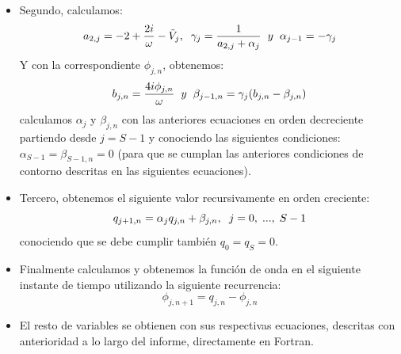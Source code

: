 \documentclass[12pt,paper]{article}
\begin{document}
\begin{itemize}
\begin{itemize}
        \item Segundo, calculamos:
        \begin{equation*}
            a_{2,j} = -2 + \frac{2i}{\omega} - \Tilde{V}_j, \hspace{2mm} \gamma_j = \frac{1}{a_{2,j}+\alpha_j} \hspace{2mm} y \hspace{2mm} \alpha_{j-1} = - \gamma_j
        \end{equation*}
        Y con la correspondiente $\phi_{j,n}$, obtenemos:
        \begin{equation}
            b_{j,n} = \frac{4i \phi_{j,n}}{\omega} \hspace{2mm} y \hspace{2mm} \beta_{j-1,n} = \gamma_j(b_{j,n}-\beta_{j,n})
        \end{equation}
        calculamos $\alpha_j$ y $\beta_{j,n}$ con las anteriores ecuaciones en orden decreciente partiendo desde $j = S-1$ y conociendo las siguientes condiciones: $\alpha_{S-1} = \beta_{S-1,n} = 0$ (para que se cumplan las anteriores condiciones de contorno descritas en las siguientes ecuaciones).

        \item Tercero, obtenemos el siguiente valor recursivamente en orden creciente: 
        \begin{equation*}
            q_{j+1,n} = \alpha_j q_{j,n} + \beta_{j,n}, \hspace{2mm} j = 0, \hspace{1mm} ..., \hspace{1mm} S-1
        \end{equation*}
        conociendo que se debe cumplir también $q_0 = q_S = 0$.
        
        \item Finalmente calculamos y obtenemos la función de onda en el siguiente instante de tiempo utilizando la siguiente recurrencia:
        \begin{equation*}
            \phi_{j,n+1} = q_{j,n} - \phi_{j,n}
        \end{equation*}

        \item El resto de variables se obtienen con sus respectivas ecuaciones, descritas con anterioridad a lo largo del informe, directamente en Fortran.
    \end{itemize}
    
\end{itemize}
\end{document}
